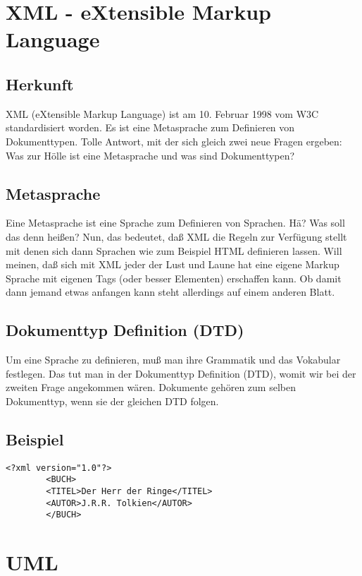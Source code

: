 
\section{XML - eXtensible Markup Language}
	\subsection{Herkunft}
		XML (eXtensible Markup Language) ist am 10. Februar 1998 vom W3C standardisiert worden. Es ist eine Metasprache zum Definieren von Dokumenttypen. Tolle Antwort, mit der sich gleich zwei neue Fragen ergeben: Was zur Hölle ist eine Metasprache und was sind Dokumenttypen?
	
	\subsection{Metasprache}
		Eine Metasprache ist eine Sprache zum Definieren von Sprachen. Hä? Was soll das denn heißen? Nun, das bedeutet, daß XML die Regeln zur Verfügung stellt mit denen sich dann Sprachen wie zum Beispiel HTML definieren lassen. Will meinen, daß sich mit XML jeder der Lust und Laune hat eine eigene Markup Sprache mit eigenen Tags (oder besser Elementen) erschaffen kann. Ob damit dann jemand etwas anfangen kann steht allerdings auf einem anderen Blatt.
		
	\subsection{Dokumenttyp Definition (DTD)}
		Um eine Sprache zu definieren, muß man ihre Grammatik und das Vokabular festlegen. Das tut man in der Dokumenttyp Definition (DTD), womit wir bei der zweiten Frage angekommen wären. Dokumente gehören zum selben Dokumenttyp, wenn sie der gleichen DTD folgen.
	
	\subsection{Beispiel}
		\begin{lstlisting}[style=XML, caption=XML-Example]
		<?xml version="1.0"?>
		<BUCH>
		<TITEL>Der Herr der Ringe</TITEL>
		<AUTOR>J.R.R. Tolkien</AUTOR>
		</BUCH>
		\end{lstlisting}
		
		\newpage
		
\section{UML}
